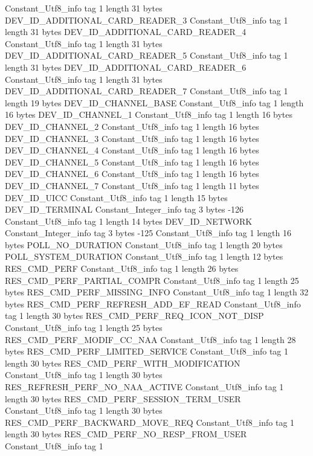 {{{		}
		Constant_Utf8_info {
			tag	1
			length	31
			bytes	DEV_ID_ADDITIONAL_CARD_READER_3
		}
		Constant_Utf8_info {
			tag	1
			length	31
			bytes	DEV_ID_ADDITIONAL_CARD_READER_4
		}
		Constant_Utf8_info {
			tag	1
			length	31
			bytes	DEV_ID_ADDITIONAL_CARD_READER_5
		}
		Constant_Utf8_info {
			tag	1
			length	31
			bytes	DEV_ID_ADDITIONAL_CARD_READER_6
		}
		Constant_Utf8_info {
			tag	1
			length	31
			bytes	DEV_ID_ADDITIONAL_CARD_READER_7
		}
		Constant_Utf8_info {
			tag	1
			length	19
			bytes	DEV_ID_CHANNEL_BASE
		}
		Constant_Utf8_info {
			tag	1
			length	16
			bytes	DEV_ID_CHANNEL_1
		}
		Constant_Utf8_info {
			tag	1
			length	16
			bytes	DEV_ID_CHANNEL_2
		}
		Constant_Utf8_info {
			tag	1
			length	16
			bytes	DEV_ID_CHANNEL_3
		}
		Constant_Utf8_info {
			tag	1
			length	16
			bytes	DEV_ID_CHANNEL_4
		}
		Constant_Utf8_info {
			tag	1
			length	16
			bytes	DEV_ID_CHANNEL_5
		}
		Constant_Utf8_info {
			tag	1
			length	16
			bytes	DEV_ID_CHANNEL_6
		}
		Constant_Utf8_info {
			tag	1
			length	16
			bytes	DEV_ID_CHANNEL_7
		}
		Constant_Utf8_info {
			tag	1
			length	11
			bytes	DEV_ID_UICC
		}
		Constant_Utf8_info {
			tag	1
			length	15
			bytes	DEV_ID_TERMINAL
		}
		Constant_Integer_info {
			tag	3
			bytes	-126
		}
		Constant_Utf8_info {
			tag	1
			length	14
			bytes	DEV_ID_NETWORK
		}
		Constant_Integer_info {
			tag	3
			bytes	-125
		}
		Constant_Utf8_info {
			tag	1
			length	16
			bytes	POLL_NO_DURATION
		}
		Constant_Utf8_info {
			tag	1
			length	20
			bytes	POLL_SYSTEM_DURATION
		}
		Constant_Utf8_info {
			tag	1
			length	12
			bytes	RES_CMD_PERF
		}
		Constant_Utf8_info {
			tag	1
			length	26
			bytes	RES_CMD_PERF_PARTIAL_COMPR
		}
		Constant_Utf8_info {
			tag	1
			length	25
			bytes	RES_CMD_PERF_MISSING_INFO
		}
		Constant_Utf8_info {
			tag	1
			length	32
			bytes	RES_CMD_PERF_REFRESH_ADD_EF_READ
		}
		Constant_Utf8_info {
			tag	1
			length	30
			bytes	RES_CMD_PERF_REQ_ICON_NOT_DISP
		}
		Constant_Utf8_info {
			tag	1
			length	25
			bytes	RES_CMD_PERF_MODIF_CC_NAA
		}
		Constant_Utf8_info {
			tag	1
			length	28
			bytes	RES_CMD_PERF_LIMITED_SERVICE
		}
		Constant_Utf8_info {
			tag	1
			length	30
			bytes	RES_CMD_PERF_WITH_MODIFICATION
		}
		Constant_Utf8_info {
			tag	1
			length	30
			bytes	RES_REFRESH_PERF_NO_NAA_ACTIVE
		}
		Constant_Utf8_info {
			tag	1
			length	30
			bytes	RES_CMD_PERF_SESSION_TERM_USER
		}
		Constant_Utf8_info {
			tag	1
			length	30
			bytes	RES_CMD_PERF_BACKWARD_MOVE_REQ
		}
		Constant_Utf8_info {
			tag	1
			length	30
			bytes	RES_CMD_PERF_NO_RESP_FROM_USER
		}
		Constant_Utf8_info {
			tag	1
}}}
